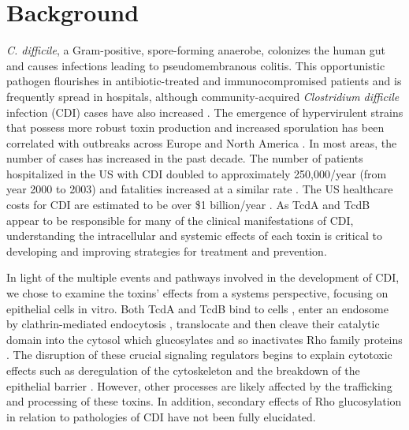 \section{Background}
\textit{C. difficile}, a Gram-positive, spore-forming 
anaerobe, colonizes the human gut and causes infections 
leading to pseudomembranous colitis.  This opportunistic 
pathogen flourishes in antibiotic-treated and immunocompromised 
patients and is frequently spread in hospitals, although 
community-acquired \textit{Clostridium difficile} 
infection (CDI) cases have also increased \cite{Freeman:2010bv}. 
The emergence of hypervirulent strains that possess more 
robust toxin production and increased sporulation has been 
correlated with outbreaks across Europe and North 
America \cite{Warny:2005kd}. In most areas, the number 
of cases has increased in the past decade. The number 
of patients hospitalized in the US with CDI doubled to 
approximately 250,000/year (from year 2000 to 2003) and 
fatalities increased at a similar rate \cite{Zilberberg:2008gd}. 
The US healthcare costs for CDI are estimated to be over \$1 
billion/year \cite{Dubberke:2009ic}. As TcdA and TcdB appear 
to be responsible for many of the clinical manifestations of 
CDI, understanding the intracellular and systemic effects 
of each toxin is critical to developing and improving strategies 
for treatment and prevention.

In light of the multiple events and pathways involved in 
the development of CDI, we chose to examine the toxins' 
effects from a systems perspective, focusing on epithelial 
cells in vitro. Both TcdA and TcdB bind to 
cells \cite{Frisch:2003jo}, enter an endosome by clathrin-mediated 
endocytosis \cite{Papatheodorou:2010io}, translocate and then 
cleave their catalytic domain into the cytosol which 
glucosylates and so inactivates Rho family 
proteins \cite{Egerer:2007fy}. The disruption of these crucial 
signaling regulators begins to explain cytotoxic effects 
such as deregulation of the cytoskeleton and the breakdown 
of the epithelial barrier \cite{Nusrat:2001cs}. However, 
other processes are likely affected by the trafficking 
and processing of these toxins. In addition, secondary 
effects of Rho glucosylation in relation to pathologies 
of CDI have not been fully elucidated.

